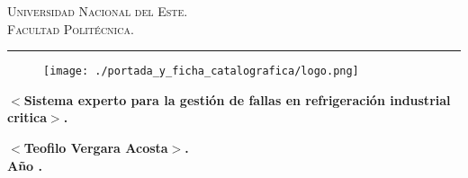 \documentclass[12pt,a4paper,oneside]{book}
\begin{document}

\renewcommand\listtablename{\'Indice de Tablas}

\renewcommand{\tablename}{Tabla}
\renewcommand{\acronymname}{Acronimos y simbolos}
\renewcommand{\bibname}{Referencias bibliograficas}
\frontmatter
\vspace*{-3cm}
\begin{figure}[h]
\leavevmode
\begin{minipage}{\textwidth}
\begin{center}
\end{center}
\end{minipage}
\end{figure}

\thispagestyle{empty}

{\bf
\begin{center}
\large
\vspace*{-1 cm}\Large \textsc{Universidad Nacional del Este.} \\
\Large \textsc{Facultad Politécnica.} \\
\vspace*{0.5 cm}\hrule
\end{center}
}

\vspace*{-0.5 cm}
\begin{figure}[htb]
\begin{center}
\texttt{[image: ./portada\_y\_ficha\_catalografica/logo.png]}

\end{center}
\end{figure}


\vspace{3 cm}
{
\noindent
\begin{center}
\huge \bf $<$Sistema experto para la gestión de fallas en refrigeración industrial critica$>$.
\end{center}
}


\vspace{6 cm}

\begin{center}
{\textbf{\Large $<$Teofilo Vergara Acosta$>$.}\\[5mm]
\vspace{1 cm}
\textbf{Año \the\year.}}
\end{center}

\end{document}
